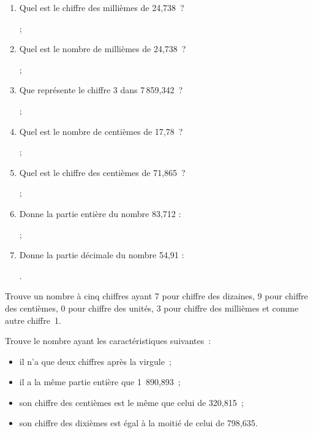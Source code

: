 \begin{exercice}
\begin{enumerate}
 \item Quel est le chiffre des millièmes de 24,738 ?
 
 \dotfill ;
 \item Quel est le nombre de millièmes de 24,738 ?
 
 \dotfill ;
 \item Que représente le chiffre 3 dans 7\,859,342 ?
 
 \dotfill ;
 \item Quel est le nombre de centièmes de 17,78 ?
 
 \dotfill ;
 \item Quel est le chiffre des centièmes de 71,865 ?
 
 \dotfill ;
 \item Donne la partie entière du nombre 83,712 :
 
 \dotfill ;
 \item Donne la partie décimale du nombre 54,91 :
 
 \dotfill.
 \end{enumerate}
\end{exercice}


\begin{exercice}
Trouve un nombre à cinq chiffres ayant 7 pour chiffre des dizaines, 9 pour chiffre des centièmes, 0 pour chiffre des unités, 3 pour chiffre des millièmes et comme autre chiffre 1.
\end{exercice}


\begin{exercice}[Devinette]
Trouve le nombre ayant les caractéristiques suivantes :
\begin{itemize}
 \item il n'a que deux chiffres après la virgule ;
 \item il a la même partie entière que 1 890,893 ;
 \item son chiffre des centièmes est le même que celui de 320,815 ;
 \item son chiffre des dixièmes est égal à la moitié de celui de 798,635.
 \end{itemize}
\end{exercice}


